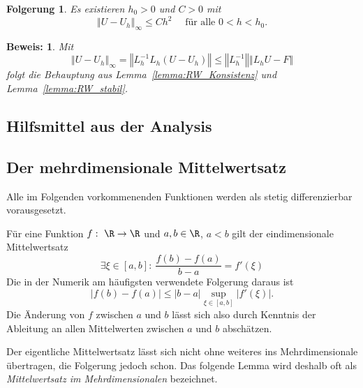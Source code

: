 \documentclass[
]{mycourse}
\theoremstyle{mythm}
\newtheorem{korollar}[theorem]{Folgerung}
\theoremstyle{break}
\newtheorem*{beweis}{Beweis:}
\newcommand{\norm}[1]{\left\Vert#1\right\Vert}		%
\begin{document}
\begin{korollar}
Es existieren $h_0>0$ und $C>0$ mit 
\[
\norm{U-U_h}_\infty\leq C h^2 \quad \mbox{ für alle } 0<h<h_0.
\]
\end{korollar}
\begin{beweis}
Mit
\[
\norm{U-U_h}_\infty = \norm{L_h^{-1} L_h (U-U_h)}\leq \norm{L_h^{-1}} \norm{L_h U-F}
\]
folgt die Behauptung aus Lemma~\ref{lemma:RW_Konsistenz} und Lemma~\ref{lemma:RW_stabil}.
\end{beweis}

\begin{appendix} 

\chapter{Hilfsmittel aus der Analysis}

\section{Der mehrdimensionale Mittelwertsatz}
Alle im Folgenden vorkommenenden Funktionen werden als stetig differenzierbar vorausgesetzt.

Für eine Funktion $f:\ \R\to \R$ und $a,b\in \R$, $a<b$ gilt der eindimensionale
Mittelwertsatz 
\[
\exists \xi\in [a,b]:\ \frac{f(b)-f(a)}{b-a}=f'(\xi)
\]
Die in der Numerik am häufigsten verwendete Folgerung daraus ist
\[
|f(b)-f(a)|\leq |b-a| \sup_{\xi \in [a,b]} |f'(\xi)|.
\]
Die Änderung von $f$ zwischen $a$ und $b$ lässt sich also durch Kenntnis der Ableitung
an allen Mittelwerten zwischen $a$ und $b$ abschätzen.

Der eigentliche Mittelwertsatz lässt sich nicht ohne weiteres ins Mehrdimensionale übertragen, die Folgerung
jedoch schon. Das folgende Lemma wird deshalb oft als \emph{Mittelwertsatz im Mehrdimensionalen}
bezeichnet.


\end{appendix}
\end{document}
